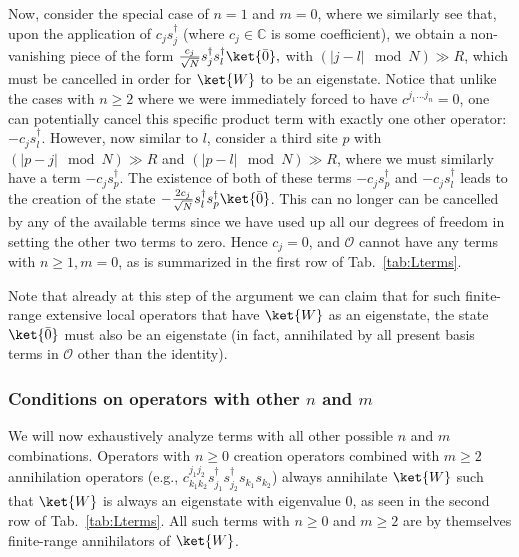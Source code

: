 \documentclass[prx,letterpaper,aps,superscriptaddress,floatfix,twocolumn,nofootinbib]{revtex4-2}
\theoremstyle{definition}
\begin{document}
%
Now, consider the special case of $n=1$ and $m=0$, where we similarly see that, upon the application of $c_j s^\dag_j$ (where $c_j\in \mathbb{C}$ is some coefficient), we obtain a non-vanishing piece of the form
$\frac{c_j}{\sqrt{N}} s^\dag_{j}s_l^\dag\ket{\bar{0}},$
with $(|j-l|\mod N)\gg R$, which must be cancelled in order for $\ket{W}$ to be an eigenstate.
%
Notice that unlike the cases with $n\geq 2$ where we were immediately forced to have $c^{j_1...j_n}=0$, one can potentially cancel this specific product term with exactly one other operator: $-c_j s^\dag_l$.
%
However, now similar to $l$, consider a third site $p$ with $(|p-j|\mod N)\gg R$ and $(|p-l|\mod N)\gg R$, where we must similarly have a term $-c_j s^\dag_p$.
%
The existence of both of these terms $-c_j s^\dagger_p$ and $-c_j s^\dag_l$ leads to the creation of the state
$-\frac{2c_j}{\sqrt{N}} s^\dag_{l}s_p^\dag\ket{\bar{0}}$.
%
This can no longer can be cancelled by any of the available terms since we have used up all our degrees of freedom in setting the other two terms to zero.
%
Hence $c_j=0$, and $\mathcal{O}$ cannot have any terms with $n\geq 1,m=0$, as is summarized in the first row of Tab.~\ref{tab:Lterms}.
%

%
Note that already at this step of the argument we can claim that for such finite-range extensive local operators that have $\ket{W}$ as an eigenstate, the state $\ket{\bar{0}}$ must also be an eigenstate (in fact, annihilated by all present basis terms in $\mathcal{O}$ other than the identity).
%

%
\subsubsection{Conditions on operators with other $n$ and $m$}
%
We will now exhaustively analyze terms with all other possible $n$ and $m$ combinations.
%
Operators with $n\geq 0$ creation operators combined with $m\geq 2$ annihilation operators (e.g., $c^{j_1 j_2}_{k_1 k_2}s^\dag_{j_1} s^\dag_{j_2} s_{k_1} s_{k_2}$) always annihilate $\ket{W}$ such that $\ket{W}$ is always an eigenstate with eigenvalue $0$, as seen in the second row of Tab.~\ref{tab:Lterms}.
%
All such terms with $n\geq 0$ and $m\geq 2$ are by themselves finite-range annihilators of $\ket{W}$.
%
\end{document}
